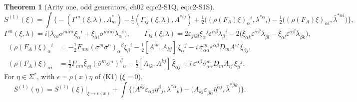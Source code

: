 \documentclass[11pt]{article}
\theoremstyle{definition}
\newtheorem{theorem}[definition]{Theorem}
\begin{document}
\begin{theorem}[Arity one, odd generators, ch02 eq:c2-S1Q, eq:c2-S1S]\label{thm:S1odd}
\begin{equation}\tag{F1}
S^{(1)}(\xi)=\int\Big\{-(\Gamma^m(\xi,\lambda),A^*_m)-\tfrac14(\Gamma_{ij}(\xi,\lambda),A^{*ij})+\tfrac12\big((\rho(F_A)\xi)_\alpha{}^i,\lambda^{*\alpha}{}_i\big)-\tfrac12\big((\rho(F_A)\xi)_{\dot\alpha i},\bar\lambda^{*\dot\alpha i}\big)\Big\},
\end{equation}
\[
\Gamma^m(\xi,\lambda)=i\big(\bar\lambda_{\dot\alpha i}\bar\sigma^{m\dot\alpha\alpha}\xi_\alpha{}^i+\bar\xi_{\dot\alpha i}\bar\sigma^{m\dot\alpha\alpha}\lambda_\alpha{}^i\big),\qquad
\Gamma_{kl}(\xi,\lambda)=2\varepsilon_{jikl}\xi_\alpha{}^j\varepsilon^{\alpha\beta}\lambda_\beta{}^i-2\big(\bar\xi_{\dot\alpha k}\varepsilon^{\dot\alpha\dot\beta}\bar\lambda_{\dot\beta l}-\bar\xi_{\dot\alpha l}\varepsilon^{\dot\alpha\dot\beta}\bar\lambda_{\dot\beta k}\big),
\]
\begin{align*}
(\rho(F_A)\xi)_\alpha{}^i&=-\tfrac12F_{mn}(\sigma^m\bar\sigma^n)_\alpha{}^\beta\xi_\beta{}^i-\tfrac12[A^{ik},A_{kj}]\,\xi_\alpha{}^j-i\,\sigma^m_{\alpha\dot\alpha}\varepsilon^{\dot\alpha\dot\beta}D_mA^{ij}\,\bar\xi_{\dot\beta j},\\
(\rho(F_A)\xi)_{\dot\alpha i}&=\tfrac12F_{mn}\bar\xi_{\dot\beta i}(\bar\sigma^m\sigma^n)^{\dot\beta}{}_{\dot\alpha}-\tfrac12[A_{ik},A^{kj}]\,\bar\xi_{\dot\alpha j}+i\,\varepsilon^{\alpha\beta}\sigma^m_{\alpha\dot\alpha}D_mA_{ij}\,\xi_\beta{}^j .
\end{align*}
For $\eta\in\Sigma^*$, with $\epsilon=\rho(x)\eta$ of (K1) ($\xi=0$),
\begin{equation}\tag{F2}
S^{(1)}(\eta)=S^{(1)}(\xi)\big|_{\xi\to\epsilon(x)}+\int\Big\{\big(A^{kj}\varepsilon_{\alpha\beta}\eta^\beta{}_j,\lambda^{*\alpha}{}_k\big)-\big(A_{kj}\varepsilon_{\dot\beta\dot\alpha}\bar\eta^{\dot\alpha j},\bar\lambda^{*\dot\beta k}\big)\Big\}.
\end{equation}
\end{theorem}
\end{document}

